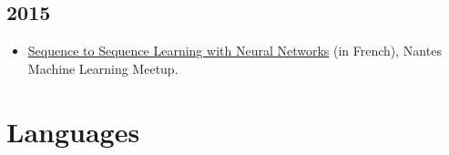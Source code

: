 \documentclass[11pt,a4paper,sans]{moderncv}        %
\begin{document}
\subsection{2015}

\begin{itemize}
\item
  \href{https://www.meetup.com/Nantes-Machine-Learning-Meetup/events/221108033/}{Sequence
    to Sequence Learning with Neural Networks} (in French), Nantes
  Machine Learning Meetup.
\end{itemize}

\section{Languages}
\end{document}
